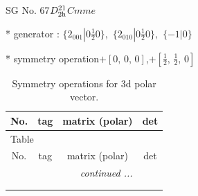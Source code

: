 \documentclass[fleqn,8pt]{jsarticle}
\begin{document}
\setcounter{MaxMatrixCols}{32}

\renewcommand{\tablename}{Table~}
\renewcommand{\figurename}{Figure~}
\begin{center}
\LARGE
SG No. 67\quad$D_{\rm 2h}^{21}$\quad$Cmme$\quad[ orthorhombic ]
\end{center}

* generator : $\{2{}_{001}|0 \frac{1}{2} 0\},\,\,\{2{}_{010}|0 \frac{1}{2} 0\},\,\,\{-1|0\}$

* symmetry operation\quad$+\left[ 0,\, 0,\, 0 \right]$,\quad $+\left[ \frac{1}{2},\, \frac{1}{2},\, 0 \right]$
\renewcommand{\arraystretch}{1.3}
\begin{longtable}{cccc}
\caption{Symmetry operations for 3d polar vector.}
 \\
 \hline \hline
No. & tag & matrix (polar) & det \\ \hline \endfirsthead

\multicolumn{3}{l}{\tablename\ \thetable{}} \\
 \hline \hline
No. & tag & matrix (polar) & det \\ \hline \endhead

 \hline \hline
\multicolumn{3}{r}{\footnotesize\it continued ...} \\ \endfoot

 \hline \hline
\multicolumn{3}{r}{} \\ \endlastfoot


\end{longtable}
\end{document}
